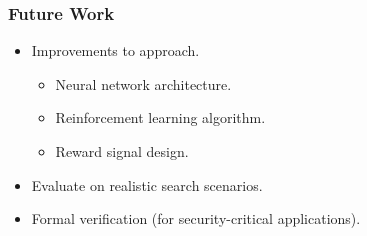 \begin{frame}
    \frametitle{Future Work}

    \begin{itemize}
        \item Improvements to approach.
        \begin{itemize}
            \item Neural network architecture.
            \item Reinforcement learning algorithm.
            \item Reward signal design.
        \end{itemize}
        \item Evaluate on realistic search scenarios.
        \item Formal verification (for security-critical applications).
    \end{itemize}
\end{frame}